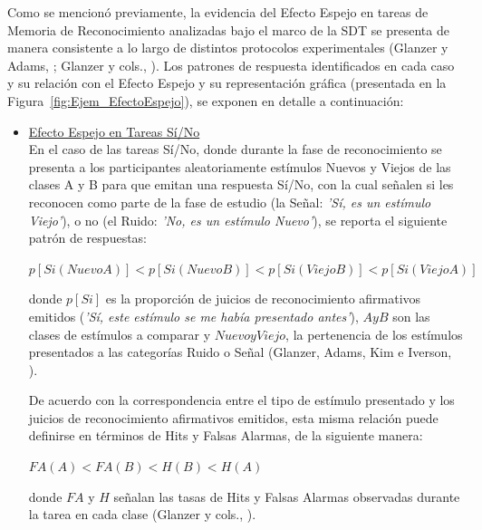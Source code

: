 Como se mencionó previamente, la evidencia del Efecto Espejo en tareas de Memoria de Reconocimiento analizadas bajo el marco de la SDT se presenta de manera consistente a lo largo de distintos protocolos experimentales (Glanzer y Adams, \citeyear{Glanzer1990}; Glanzer y cols., \citeyear{Glanzer1993}). Los patrones de respuesta identificados en cada caso y su relación con el Efecto Espejo y su representación gráfica (presentada en la Figura~\ref{fig:Ejem_EfectoEspejo}), se exponen en detalle a continuación:\\

\begin{itemize}
\item \underline{Efecto Espejo en Tareas Sí/No}\\

En el caso de las tareas Sí/No, donde durante la fase de reconocimiento se presenta a los participantes aleatoriamente estímulos Nuevos y Viejos de las clases A y B para que emitan una respuesta Sí/No, con la cual señalen si les reconocen como parte de la fase de estudio (la Señal: \textit{'Sí, es un estímulo Viejo'}), o no (el Ruido: \textit{'No, es un estímulo Nuevo'}), se reporta el siguiente patrón de respuestas:\\

\begin{center}
$p[Si(NuevoA)] < p[Si(NuevoB)] < p[Si(ViejoB)] < p[Si(ViejoA)]$\\
\end{center}
\begin{center}
donde $p[Si]$ es la proporción de juicios de reconocimiento afirmativos emitidos (\textit{'Sí, este estímulo se me había presentado antes'}), $A y B$ son las clases de estímulos a comparar y $Nuevo y Viejo$, la pertenencia de los estímulos presentados a las categorías Ruido o Señal (Glanzer, Adams, Kim e Iverson, \citeyear{Glanzer1993}).\\
\end{center}

De acuerdo con la correspondencia entre el tipo de estímulo presentado y los juicios de reconocimiento afirmativos emitidos, esta misma relación puede definirse en términos de Hits y Falsas Alarmas, de la siguiente manera:\\

\begin{center}
$FA(A) < FA(B) < H(B) < H(A)$\\
\end{center}
\begin{center}
donde $FA$ y $H$ señalan las tasas de Hits y Falsas Alarmas observadas durante la tarea en cada clase (Glanzer y cols., \citeyear{Glanzer1993}).\\
\end{center}


\end{itemize}
